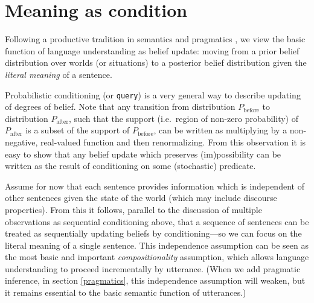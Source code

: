 \documentclass[pdfextras]{handbook}
\begin{document}
 
 
 
 
 
 
 
 
\section{Meaning as condition}
\label{literal}
\label{literal-listener}

Following a productive tradition in semantics and pragmatics \citep[][etc.]{stalnaker78,lewis79,heim82}, we view the basic function of language understanding as belief update: moving from a prior belief distribution over worlds (or situations) to a posterior belief distribution given the \emph{literal meaning} of a sentence. 

Probabilistic conditioning (or \lstinline{query}) is a very general way to describe updating of degrees of belief. Note that any transition from distribution $P_{\text{before}}$ to distribution $P_{\text{after}}$, such that the support (i.e.\ region of non-zero probability) of $P_{\text{after}}$ is a subset of the support of $P_{\text{before}}$, can be written as multiplying by a non-negative, real-valued function and then renormalizing. From this observation it is easy to show that any belief update which preserves (im)possibility can be written as the result of conditioning on some (stochastic) predicate.

Assume for now that each sentence provides information which is independent of other sentences given the state of the world (which may include discourse properties). From this it follows, parallel to the discussion of multiple observations as sequential conditioning above, that a sequence of sentences can be treated as sequentially updating beliefs by conditioning---so we can focus on the literal meaning of a single sentence. This independence assumption can be seen as the most basic and important \emph{compositionality} assumption, which allows language understanding to proceed incrementally by utterance. (When we add pragmatic inference, in section \ref{pragmatics}, this independence assumption will weaken, but it remains essential to the basic semantic function of utterances.)
\end{document}

